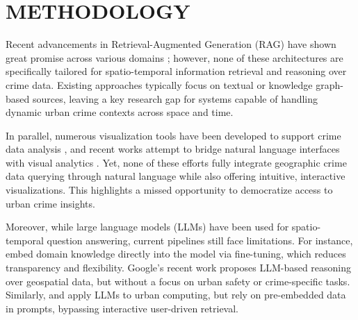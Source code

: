 \chapter{ METHODOLOGY}


Recent advancements in Retrieval-Augmented Generation (RAG) have shown great promise across various domains \cite{Yu2025SpatialRAG, Yang2024TimeRAG, He2024GRetriever, Hu2024GRAG, Guo2024LightRAG}; however, none of these architectures are specifically tailored for spatio-temporal information retrieval and reasoning over crime data. Existing approaches typically focus on textual or knowledge graph-based sources, leaving a key research gap for systems capable of handling dynamic urban crime contexts across space and time.

In parallel, numerous visualization tools have been developed to support crime data analysis \cite{Garcia2022CriPAV, Salah2022BigCDVis, Silva2017CrimeVisAI, Garcia2020MiranteAV, Garcia2021CrimAnalyzer}, and recent works attempt to bridge natural language interfaces with visual analytics \cite{Liu2024NLDriven}. Yet, none of these efforts fully integrate geographic crime data querying through natural language while also offering intuitive, interactive visualizations. This highlights a missed opportunity to democratize access to urban crime insights.

Moreover, while large language models (LLMs) have been used for spatio-temporal question answering, current pipelines still face limitations. For instance, \cite{Wei2024TourLLM} embed domain knowledge directly into the model via fine-tuning, which reduces transparency and flexibility. Google's recent work \cite{2025GoogleGeospatialReasoning} proposes LLM-based reasoning over geospatial data, but without a focus on urban safety or crime-specific tasks. Similarly, \cite{Jiang2024UrbanLLM} and \cite{Li2024UrbanGPT} apply LLMs to urban computing, but rely on pre-embedded data in prompts, bypassing interactive user-driven retrieval.

